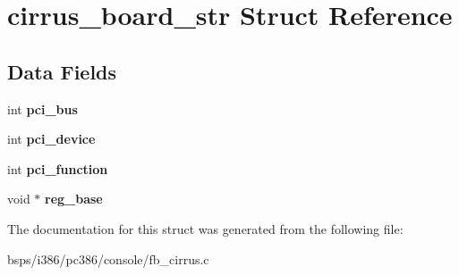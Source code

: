 \hypertarget{structcirrus__board__str}{}\section{cirrus\+\_\+board\+\_\+str Struct Reference}
\label{structcirrus__board__str}
\subsection*{Data Fields}
\begin{DoxyCompactItemize}
\item 
\mbox{\label{structcirrus__board__str_aee4ac8302c96a7119f62adac6a61af56}} 
int {\bfseries pci\+\_\+bus}
\item 
\mbox{\label{structcirrus__board__str_af431389290cb4a4d3b52374222464612}} 
int {\bfseries pci\+\_\+device}
\item 
\mbox{\label{structcirrus__board__str_ae79fcb2ae0aeb1c7b2716e2f967e8a88}} 
int {\bfseries pci\+\_\+function}
\item 
\mbox{\label{structcirrus__board__str_a150b871a4a57b1d1d2eb0543aafa3b03}} 
void $\ast$ {\bfseries reg\+\_\+base}
\end{DoxyCompactItemize}


The documentation for this struct was generated from the following file\+:\begin{DoxyCompactItemize}
\item 
bsps/i386/pc386/console/fb\+\_\+cirrus.\+c\end{DoxyCompactItemize}
